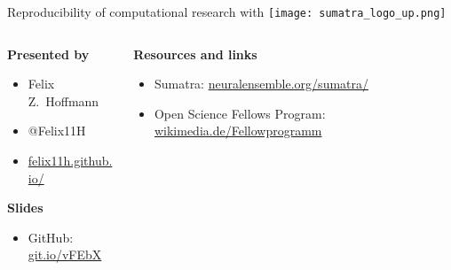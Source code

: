 \begin{frame}
  \begin{center} 
    \large Reproducibility of computational research with
    \texttt{[image: sumatra\_logo\_up.png]}
  \end{center}
  
  \vspace{0.4cm}

  \small
  \begin{columns}[t]
    \begin{column}{0.4\textwidth}        
      \textbf{Presented by}
      
      \begin{itemize}[leftmargin=0.6cm]
        \itemsep0pt
      \item[] Felix Z.~Hoffmann
        \item[] @Felix11H
        \item[] \href{http://felix11h.github.io/}{felix11h.github.io/}
      \end{itemize}

      \vspace{0.38cm}
      \textbf{Slides}
      
      \begin{itemize}[leftmargin=0.6cm]
        \item[] GitHub:\\ %
          \href{https://github.com/Felix11H/GSoC14_munich_slides}{git.io/vFEbX}
      \end{itemize}
    \end{column}
    \begin{column}{0.59\textwidth}
      \textbf{Resources and links}
      \vspace{-0.1cm}
       
      \begin{itemize}[leftmargin=0.6cm]
        \itemsep4pt
        \item[] Sumatra: %
          \href{http://neuralensemble.org/sumatra/}{%
            neuralensemble.org/sumatra/}\\
        \item[] Open Science Fellows Program: %
          \href{https://wikimedia.de/wiki/BildungWissenschaftKultur/Fellowprogramm}{%
            wikimedia.de/Fellowprogramm}
      \end{itemize}


\end{column}
\end{columns}
\end{frame}
